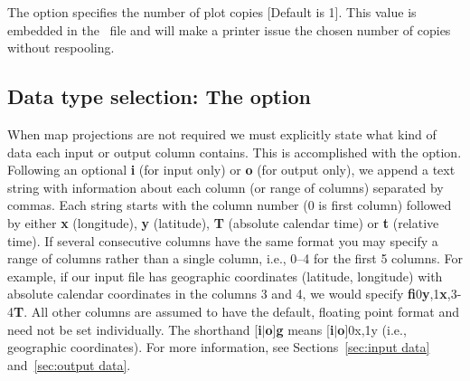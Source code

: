The  option specifies the number of plot copies [Default is 1].  This
value is embedded in the \PS\ file and will make a printer issue the chosen
number of copies without respooling.

\subsection{Data type selection: The  option}
\label{sec:fg_option}

When map projections are not required we must explicitly state
what kind of data each input or output column contains.  This is accomplished with
the  option.  Following an optional \textbf{i} (for input only) or \textbf{o} (for output
only), we append a text string with information about each column (or range of columns) separated by commas.
Each string starts with the column number (0 is first column) followed by either
\textbf{x} (longitude), \textbf{y} (latitude), \textbf{T} (absolute calendar time) or \textbf{t} (relative time).  If
several consecutive columns have the same format you may specify a range of columns
rather than a single column, i.e., 0--4 for the first 5 columns.  For example, if our
input file has geographic coordinates (latitude, longitude) with absolute calendar
coordinates in the columns 3 and 4, we would specify \textbf{fi}0\textbf{y},1\textbf{x},3-4\textbf{T}.  All other columns
are assumed to have the default, floating point format and need not be set individually.
The shorthand [\textbf{i}$|$\textbf{o}]\textbf{g} means [\textbf{i}$|$\textbf{o}]0x,1y (i.e., geographic coordinates).
For more information, see Sections~\ref{sec:input data} and~\ref{sec:output data}.

